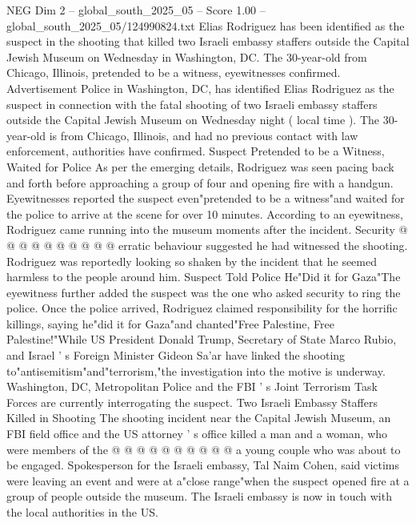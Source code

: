 \begin{textsample}{NEG Dim 2 – global\_south\_2025\_05 – Score 1.00 – global\_south\_2025\_05/124990824.txt}  \label{ex:f2_neg_407}
Elias Rodriguez has been identified as the suspect in the shooting that killed two Israeli embassy staffers outside the Capital Jewish Museum on Wednesday in Washington, DC.
The 30-year-old from Chicago, Illinois, pretended to be a witness, eyewitnesses confirmed.
Advertisement Police in Washington, DC, has identified Elias Rodriguez as the suspect in connection with the fatal shooting of two Israeli embassy staffers outside the Capital Jewish Museum on Wednesday night ( local time ).
The 30-year-old is from Chicago, Illinois, and had no previous contact with law enforcement, authorities have confirmed.
Suspect Pretended to be a Witness, Waited for Police As per the emerging details, Rodriguez was seen pacing back and forth before approaching a group of four and opening fire with a handgun.
Eyewitnesses reported the suspect even"pretended to be a witness"and waited for the police to arrive at the scene for over 10 minutes.
According to an eyewitness, Rodriguez came running into the museum moments after the incident.
Security @ @ @ @ @ @ @ @ @ @ erratic behaviour suggested he had witnessed the shooting.
Rodriguez was reportedly looking so shaken by the incident that he seemed harmless to the people around him.
Suspect Told Police He"Did it for Gaza"The eyewitness further added the suspect was the one who asked security to ring the police.
Once the police arrived, Rodriguez claimed responsibility for the horrific killings, saying he"did it for Gaza"and chanted"Free Palestine, Free Palestine!"While US President Donald Trump, Secretary of State Marco Rubio, and Israel ' s Foreign Minister Gideon Sa'ar have linked the shooting to"antisemitism"and"terrorism,"the investigation into the motive is underway.
Washington, DC, Metropolitan Police and the FBI ' s Joint Terrorism Task Forces are currently interrogating the suspect.
Two Israeli Embassy Staffers Killed in Shooting The shooting incident near the Capital Jewish Museum, an FBI field office and the US attorney ' s office killed a man and a woman, who were members of the @ @ @ @ @ @ @ @ @ @ a young couple who was about to be engaged.
Spokesperson for the Israeli embassy, Tal Naim Cohen, said victims were leaving an event and were at a"close range"when the suspect opened fire at a group of people outside the museum.
The Israeli embassy is now in touch with the local authorities in the US.

\end{textsample}
